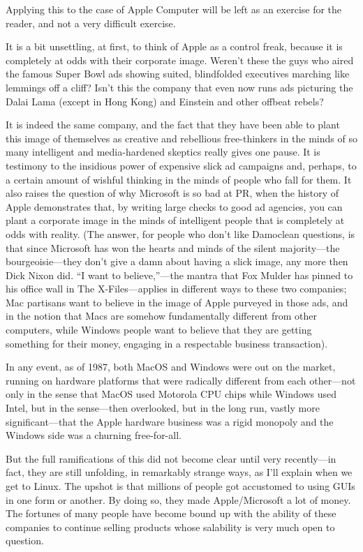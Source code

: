 \documentclass[
  fontsize=11pt,
  paper=landscape,
  twocolumn=true,
  pagesize=pdftex,
  headings=small,
  DIV=15,
  ]{scrartcl}
\begin{document}
Applying this to the case of Apple Computer will be left as an exercise
for the reader, and not a very difficult exercise.

It is a bit unsettling, at first, to think of Apple as a control freak,
because it is completely at odds with their corporate image. Weren't
these the guys who aired the famous Super Bowl ads showing suited,
blindfolded executives marching like lemmings off a cliff? Isn't this
the company that even now runs ads picturing the Dalai Lama (except in
Hong Kong) and Einstein and other offbeat rebels?

It is indeed the same company, and the fact that they have been able to
plant this image of themselves as creative and rebellious free-thinkers
in the minds of so many intelligent and media-hardened skeptics really
gives one pause. It is testimony to the insidious power of expensive
slick ad campaigns and, perhaps, to a certain amount of wishful thinking
in the minds of people who fall for them. It also raises the question of
why Microsoft is so bad at PR, when the history of Apple demonstrates
that, by writing large checks to good ad agencies, you can plant a
corporate image in the minds of intelligent people that is completely at
odds with reality. (The answer, for people who don't like Damoclean
questions, is that since Microsoft has won the hearts and minds of the
silent majority---the bourgeoisie---they don't give a damn about having
a slick image, any more then Dick Nixon did. ``I want to
believe,''---the mantra that Fox Mulder has pinned to his office wall in
The X-Files---applies in different ways to these two companies; Mac
partisans want to believe in the image of Apple purveyed in those ads,
and in the notion that Macs are somehow fundamentally different from
other computers, while Windows people want to believe that they are
getting something for their money, engaging in a respectable business
transaction).

In any event, as of 1987, both MacOS and Windows were out on the market,
running on hardware platforms that were radically different from each
other---not only in the sense that MacOS used Motorola CPU chips while
Windows used Intel, but in the sense---then overlooked, but in the long
run, vastly more significant---that the Apple hardware business was a
rigid monopoly and the Windows side was a churning free-for-all.

But the full ramifications of this did not become clear until very
recently---in fact, they are still unfolding, in remarkably strange
ways, as I'll explain when we get to Linux. The upshot is that millions
of people got accustomed to using GUIs in one form or another. By doing
so, they made Apple/Microsoft a lot of money. The fortunes of many
people have become bound up with the ability of these companies to
continue selling products whose salability is very much open to
question.
\end{document}
